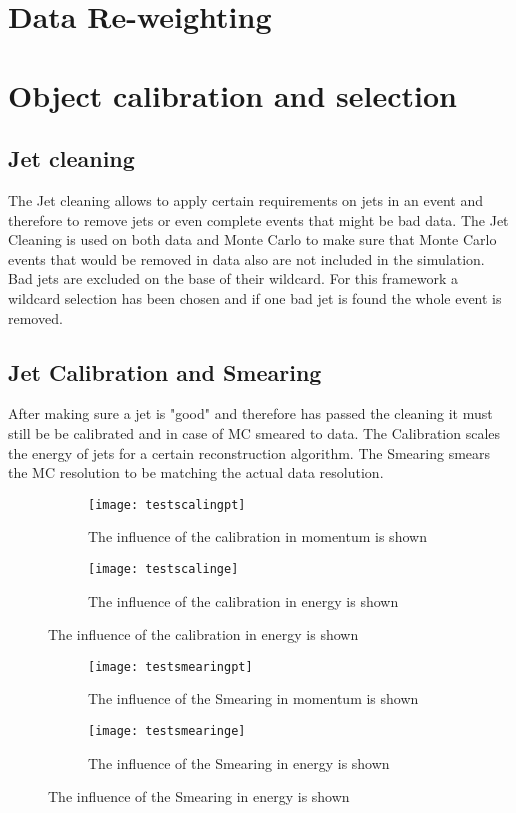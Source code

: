 \section{Data Re-weighting}

\section{Object calibration and selection}

\subsection{Jet cleaning}

The Jet cleaning allows to apply certain requirements on jets in an event and therefore to remove jets or even complete events that might be bad data. The Jet Cleaning is used on both data and Monte Carlo to make sure that Monte Carlo events that would be removed in data also are not included in the simulation.
Bad jets are excluded on the base of their wildcard.
For this framework a wildcard selection has been chosen and if one bad jet is found the whole event is removed.

\subsection{Jet Calibration and Smearing}

After making sure a jet is "good" and therefore has passed the cleaning it must still be be calibrated and in case of MC smeared to data. The Calibration scales the energy of jets for a certain reconstruction algorithm. The Smearing smears the MC resolution to be matching the actual data resolution.


\begin{figure}
\centering
\begin{subfigure}[b]{0.5\figwidth}
\texttt{[image: testscalingpt]}
\caption[Influence of the JES on the transversal momentum]{The influence of the calibration in momentum is shown}
\label{fig:testscalingpt}
\end{subfigure}
\begin{subfigure}[b]{0.5\figwidth}
\texttt{[image: testscalinge]}
\caption[Influence of the JES on the energy]{The influence of the calibration in energy is shown}
\label{fig:testscalinge}
\end{subfigure}
\end{figure}


\begin{figure}
\centering
\begin{subfigure}[b]{0.5\figwidth}
\texttt{[image: testsmearingpt]}
\caption[Influence of the Smearing on the transversal momentum]{The influence of the Smearing in momentum is shown}
\label{fig:testsmearingpt}
\end{subfigure}
\begin{subfigure}[b]{0.5\figwidth}
\texttt{[image: testsmearinge]}
\caption[Influence of the Smearing on the energy]{The influence of the Smearing in energy is shown}
\label{fig:testsmearinge}
\end{subfigure}
\end{figure}


